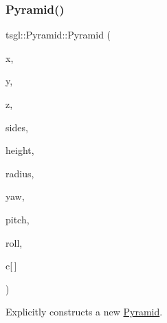 \subsubsection{\texorpdfstring{Pyramid()}{Pyramid()}\hspace{0.1cm}{\footnotesize\ttfamily [2/2]}}
{\footnotesize\ttfamily tsgl\+::\+Pyramid\+::\+Pyramid (\begin{DoxyParamCaption}\item[{float}]{x,  }\item[{float}]{y,  }\item[{float}]{z,  }\item[{int}]{sides,  }\item[{G\+Lfloat}]{height,  }\item[{G\+Lfloat}]{radius,  }\item[{float}]{yaw,  }\item[{float}]{pitch,  }\item[{float}]{roll,  }\item[{\hyperlink{structtsgl_1_1_color_float}{Color\+Float}}]{c\mbox{[}$\,$\mbox{]} }\end{DoxyParamCaption})}



Explicitly constructs a new \hyperlink{classtsgl_1_1_pyramid}{Pyramid}. 

